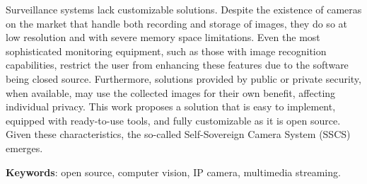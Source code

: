 \documentclass[12pt, %
openright, 
oneside, %
a4paper,    %
brazil]{facom-ufu-abntex2}
\begin{document}
\begin{resumo}[Abstract]

	Surveillance systems lack customizable solutions. Despite the existence of
	cameras on the market that handle both recording and storage of images, they do
	so at low resolution and with severe memory space limitations. Even the most
	sophisticated monitoring equipment, such as those with image recognition
	capabilities, restrict the user from enhancing these features due to the
	software being closed source. Furthermore, solutions provided by public or
	private security, when available, may use the collected images for their own
	benefit, affecting individual privacy. This work proposes a solution that is
	easy to implement, equipped with ready-to-use tools, and fully customizable as
	it is open source. Given these characteristics, the so-called Self-Sovereign
	Camera System (SSCS) emerges.

	\vspace{\onelineskip}
	\noindent
	\textbf{Keywords}: open source, computer vision, IP camera, multimedia streaming.
\end{resumo}

\listoffigures*
\cleardoublepage

\listoftables*
\cleardoublepage
\end{document}
